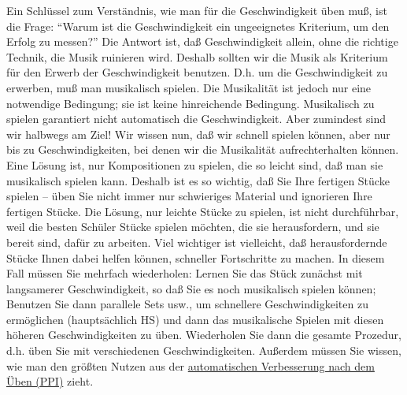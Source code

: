 Ein Schlüssel zum Verständnis, wie man für die Geschwindigkeit üben muß, ist die Frage: \enquote{Warum ist die Geschwindigkeit ein ungeeignetes Kriterium, um den Erfolg zu messen?}
Die Antwort ist, daß Geschwindigkeit allein, ohne die richtige Technik, die Musik ruinieren wird.
Deshalb sollten wir die Musik als Kriterium für den Erwerb der Geschwindigkeit benutzen.
D.h. um die Geschwindigkeit zu erwerben, muß man musikalisch spielen.
Die Musikalität ist jedoch nur eine notwendige Bedingung; sie ist keine hinreichende Bedingung.
Musikalisch zu spielen garantiert nicht automatisch die Geschwindigkeit.
Aber zumindest sind wir halbwegs am Ziel!
Wir wissen nun, daß wir schnell spielen können, aber nur bis zu Geschwindigkeiten, bei denen wir die Musikalität aufrechterhalten können.
Eine Lösung ist, nur Kompositionen zu spielen, die so leicht sind, daß man sie musikalisch spielen kann.
Deshalb ist es so wichtig, daß Sie Ihre fertigen Stücke spielen -- üben Sie nicht immer nur schwieriges Material und ignorieren Ihre fertigen Stücke.
Die Lösung, nur leichte Stücke zu spielen, ist nicht durchführbar, weil die besten Schüler Stücke spielen möchten, die sie herausfordern, und sie bereit sind, dafür zu arbeiten. 
Viel wichtiger ist vielleicht, daß herausfordernde Stücke Ihnen dabei helfen können, schneller Fortschritte zu machen.
In diesem Fall müssen Sie mehrfach wiederholen: Lernen Sie das Stück zunächst mit langsamerer Geschwindigkeit, so daß Sie es noch musikalisch spielen können; Benutzen Sie dann parallele Sets usw., um schnellere Geschwindigkeiten zu ermöglichen (hauptsächlich HS) und dann das musikalische Spielen mit diesen höheren Geschwindigkeiten zu üben.
Wiederholen Sie dann die gesamte Prozedur, d.h. üben Sie mit verschiedenen Geschwindigkeiten.
Außerdem müssen Sie wissen, wie man den größten Nutzen aus der \hyperref[c1ii15]{automatischen Verbesserung nach dem Üben (PPI)} zieht.

